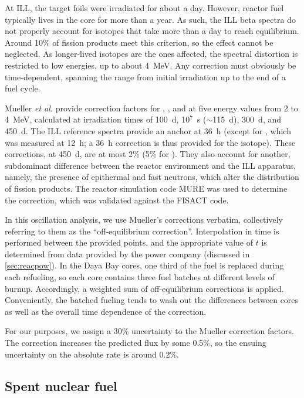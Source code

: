 \documentclass[../thesis.tex]{subfiles}
\begin{document}
At ILL, the target foils were irradiated for about a day. However, reactor fuel
typically lives in the core for more than a year. As such, the ILL beta spectra
do not properly account for isotopes that take more than a day to reach
equilibrium. Around 10\% of fission products meet this criterion, so the effect
cannot be neglected. As longer-lived isotopes are the ones affected, the
spectral distortion is restricted to low energies, up to about 4~MeV. Any
correction must obviously be time-dependent, spanning the range from initial
irradiation up to the end of a fuel cycle.

Mueller \emph{et al.} provide correction factors for \urfive, \punine, and
\puone at five energy values from 2 to 4~MeV, calculated at irradiation times of
100~d, 10$^7$~s ($\sim$115~d), 300~d, and 450~d. The ILL reference spectra
provide an anchor at 36~h (except for \urfive, which was measured at 12~h; a
36~h correction is thus provided for the isotope). These corrections, at 450~d,
are at most 2\% (5\% for \urfive). They also account for another, subdominant
difference between the reactor environment and the ILL apparatus, namely, the
presence of epithermal and fast neutrons, which alter the distribution of
fission products. The reactor simulation code MURE was used to determine the
correction, which was validated against the FISACT code.

In this oscillation analysis, we use Mueller's corrections verbatim,
collectively referring to them as the ``off-equilibrium
correction''. Interpolation in time is performed between the provided points,
and the appropriate value of $t$ is determined from data provided by the power
company (discussed in \autoref{sec:reacpow}). In the Daya Bay cores, one third
of the fuel is replaced during each refueling, so each core contains three fuel
batches at different levels of burnup. Accordingly, a weighted sum of
off-equilibrium corrections is applied. Conveniently, the batched fueling tends
to wash out the differences between cores as well as the overall time dependence
of the correction.

For our purposes, we assign a 30\% uncertainty to the Mueller correction
factors. The correction increases the predicted flux by some 0.5\%, so the
ensuing uncertainty on the absolute rate is around 0.2\%.

\subsection{Spent nuclear fuel}
\label{sec:snfcorr}
\end{document}
